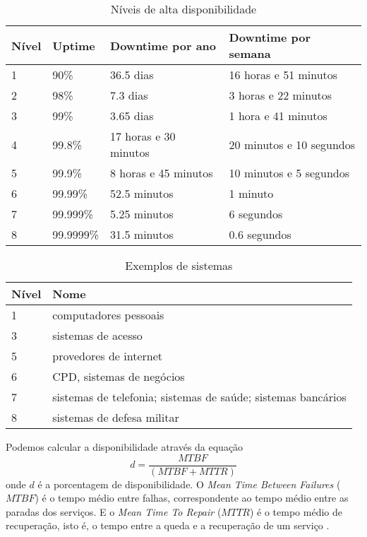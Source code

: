 \begin{table}
\caption {Níveis de alta disponibilidade}
\label{tab:dispniveis} 
\begin{center}
\begin{tabular}{|l|l|l|l|}\hline
Nível & Uptime & Downtime por ano & Downtime por semana\\\hline
1 & 90\% & 36.5 dias & 16 horas e 51 minutos\\\hline
2 & 98\% & 7.3 dias & 3 horas e 22 minutos\\\hline
3 & 99\% & 3.65 dias & 1 hora e 41 minutos\\\hline
4 & 99.8\% & 17 horas e 30 minutos & 20 minutos e 10 segundos\\\hline
5 & 99.9\% & 8 horas e 45 minutos & 10 minutos e 5 segundos\\\hline
6 & 99.99\% & 52.5 minutos & 1 minuto\\\hline
7 & 99.999\% & 5.25 minutos & 6 segundos\\\hline
8 & 99.9999\% & 31.5 minutos & 0.6 segundos\\\hline
\end{tabular}
\end{center}
\end{table}

\begin{table}
\caption {Exemplos de sistemas}
\label{tab:dispexemplos} 
\begin{center}
\begin{tabular}{|l|l|}\hline
Nível  & Nome\\\hline
1 & computadores pessoais\\\hline
3 & sistemas de acesso\\\hline
5 & provedores de internet\\\hline
6 & CPD, sistemas de negócios\\\hline
7 & sistemas de telefonia; sistemas de saúde; sistemas bancários\\\hline
8 & sistemas de defesa militar\\\hline
\end{tabular}
\end{center}
\end{table}

Podemos calcular a disponibilidade através da equação
\begin{equation}
d = \frac{MTBF}{(MTBF + MTTR)}
\label{diponibilidade}
\end{equation}
onde $d$ é a porcentagem de disponibilidade. O \textit{Mean Time Between Failures} ($MTBF$) é o tempo médio entre falhas, correspondente ao tempo médio 
entre as paradas dos serviços. E o \textit{Mean Time To Repair} ($MTTR$) é o tempo médio de recuperação, isto é, o tempo 
entre a queda e a recuperação de um serviço \cite{goncalves2009}.

